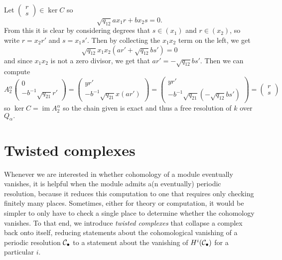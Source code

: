 \documentclass [11pt, proquest] {uwthesis}[2020/02/24]
\begin{document}
\begin{prf}
        Let $(\begin{smallmatrix}
            r\\ s
        \end{smallmatrix})\in\ker C$ so
        \[\sqrt{q_{12}}ax_1r + bx_2s=0.\]
        From this it is clear by considering degrees that $s\in (x_1)$ and $r\in(x_2)$, so write $r=x_2r'$ and $s=x_1s'.$ Then by collecting the $x_1x_2$ term on the left, we get
        \[\sqrt{q_{12}}x_1x_2(ar'+\sqrt{q_{12}}bs')=0\]
        and since $x_1x_2$ is not a zero divisor, we get that $ar'=-\sqrt{q_{12}}bs'.$ Then we can compute
        \[A_2^\alpha\begin{pmatrix}
            0 \\ -b^{-1}\sqrt{q_{21}}r'
        \end{pmatrix}=\begin{pmatrix}
            yr' \\ -b^{-1}\sqrt{q_{21}}x(ar')
        \end{pmatrix}=\begin{pmatrix}
            yr' \\ -b^{-1}\sqrt{q_{21}}(-\sqrt{q_{12}}bs')
        \end{pmatrix}=\begin{pmatrix}
            r \\ s
        \end{pmatrix}\]
        so $\ker C=\operatorname{im} A_2^\alpha$ so the chain given is exact and thus a free resolution of $k$ over $Q_\alpha.$
    \end{prf}

\section{Twisted complexes}
    Whenever we are interested in whether cohomology of a module eventually vanishes, it is helpful when the module admits a(n eventually) periodic resolution, because it reduces this computation to one that requires only checking finitely many places. Sometimes, either for theory or computation, it would be simpler to only have to check a single place to determine whether the cohomology vanishes. To that end, we introduce \textit{twisted complexes} that collapse a complex back onto itself, reducing statements about the cohomological vanishing of a periodic resolution $\mathcal{C}_\bullet$ to a statement about the vanishing of $H^i(\mathcal{C}_\bullet)$ for a particular $i$.
\end{document}
